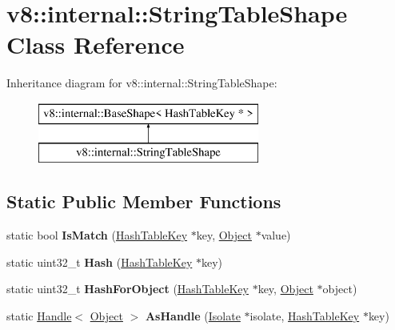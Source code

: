 \hypertarget{classv8_1_1internal_1_1_string_table_shape}{}\section{v8\+:\+:internal\+:\+:String\+Table\+Shape Class Reference}
\label{classv8_1_1internal_1_1_string_table_shape}
Inheritance diagram for v8\+:\+:internal\+:\+:String\+Table\+Shape\+:\begin{figure}[H]
\begin{center}
\leavevmode
\includegraphics[height=2.000000cm]{classv8_1_1internal_1_1_string_table_shape}
\end{center}
\end{figure}
\subsection*{Static Public Member Functions}
\begin{DoxyCompactItemize}
\item 
static bool {\bfseries Is\+Match} (\hyperlink{classv8_1_1internal_1_1_hash_table_key}{Hash\+Table\+Key} $\ast$key, \hyperlink{classv8_1_1internal_1_1_object}{Object} $\ast$value)\hypertarget{classv8_1_1internal_1_1_string_table_shape_a5e9f159278f5a174d774735b0a8edd63}{}\label{classv8_1_1internal_1_1_string_table_shape_a5e9f159278f5a174d774735b0a8edd63}

\item 
static uint32\+\_\+t {\bfseries Hash} (\hyperlink{classv8_1_1internal_1_1_hash_table_key}{Hash\+Table\+Key} $\ast$key)\hypertarget{classv8_1_1internal_1_1_string_table_shape_aae58d635ae12319ded412968d74d363f}{}\label{classv8_1_1internal_1_1_string_table_shape_aae58d635ae12319ded412968d74d363f}

\item 
static uint32\+\_\+t {\bfseries Hash\+For\+Object} (\hyperlink{classv8_1_1internal_1_1_hash_table_key}{Hash\+Table\+Key} $\ast$key, \hyperlink{classv8_1_1internal_1_1_object}{Object} $\ast$object)\hypertarget{classv8_1_1internal_1_1_string_table_shape_ac3e9f944155235114af36606e72a3550}{}\label{classv8_1_1internal_1_1_string_table_shape_ac3e9f944155235114af36606e72a3550}

\item 
static \hyperlink{classv8_1_1internal_1_1_handle}{Handle}$<$ \hyperlink{classv8_1_1internal_1_1_object}{Object} $>$ {\bfseries As\+Handle} (\hyperlink{classv8_1_1internal_1_1_isolate}{Isolate} $\ast$isolate, \hyperlink{classv8_1_1internal_1_1_hash_table_key}{Hash\+Table\+Key} $\ast$key)\hypertarget{classv8_1_1internal_1_1_string_table_shape_a448840b51e46ca6f243a58848bfaf711}{}\label{classv8_1_1internal_1_1_string_table_shape_a448840b51e46ca6f243a58848bfaf711}

\end{DoxyCompactItemize}
